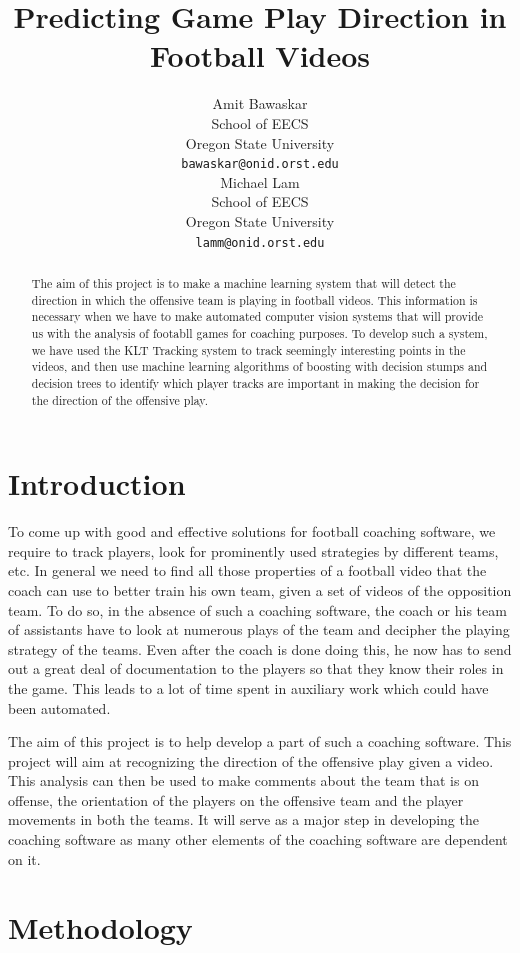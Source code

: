 \documentclass{article} %
\title{Predicting Game Play Direction in Football Videos}
\author{
Amit Bawaskar\\
School of EECS\\
Oregon State University\\
\texttt{bawaskar@onid.orst.edu} \\
\And
Michael Lam \\
School of EECS\\
Oregon State University \\
\texttt{lamm@onid.orst.edu} \\
}
\begin{document}
\maketitle

\begin{abstract}
The aim of this project is to make a machine learning system that will detect the direction in which the offensive team is playing in football videos. This information is necessary when we have to make automated computer vision systems that will provide us with the analysis of footabll games for coaching purposes. To develop such a system, we have used the KLT Tracking system to track seemingly interesting points in the videos, and then use machine learning algorithms of boosting with decision stumps and decision trees to identify which player tracks are important in making the decision for the direction of the offensive play. 
\end{abstract}

\section{Introduction}

To come up with good and effective solutions for football coaching software, we require to track players, look for prominently used strategies by different teams, etc. In general we need to find all those properties of a football video that the coach can use to better train his own team, given a set of videos of the opposition team. To do so, in the absence of such a coaching software, the coach or his team of assistants have to look at numerous plays of the team and decipher the playing strategy of the teams. Even after the coach is done doing this, he now has to send out a great deal of documentation to the players so that they know their roles in the game. This leads to a lot of time spent in auxiliary work which could have been automated. 

The aim of this project is to help develop a part of such a coaching software. This project will aim at recognizing the direction of the offensive play given a video. This analysis can then be used to make comments about the team that is on offense, the orientation of the players on the offensive team and the player movements in both the teams. It will serve as a major step in developing the coaching software as many other elements of the coaching software are dependent on it.

\section{Methodology}
\end{document}
